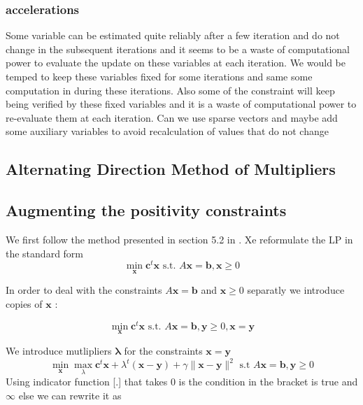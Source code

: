 \documentclass[11pt]{article}
\begin{document}
\subsubsection{accelerations}
Some variable can be estimated quite reliably after a few iteration and do not change in the subsequent iterations and it seems to be a waste of computational power to evaluate the update on these variables at each iteration. We would be temped to keep these variables fixed for some iterations and same some computation in during these iterations. Also some of the constraint will keep being verified by these fixed variables and it is a waste of computational power to re-evaluate them at each iteration. Can we use sparse vectors and maybe add some auxiliary variables to avoid recalculation of values that do not change

\subsection{Alternating Direction Method of Multipliers }
\subsection{Augmenting the positivity constraints}
We first follow the method presented in section 5.2 in  \cite{Boyd2010}.
Xe reformulate the LP in the standard form 
\begin{equation}
\mathop{min}_\mathbf{x} \mathbf{c}^t\mathbf{x} \text{ s.t. } A\mathbf{x}=\mathbf{b}, \mathbf{x}\geq 0
\end{equation}

In order to deal with the constraints $A\mathbf{x}=\mathbf{b}$ and $\mathbf{x}\geq 0$ separatly we introduce copies of $\mathbf{x}$ :

\begin{equation}
\mathop{min}_\mathbf{x} \mathbf{c}^t\mathbf{x} \text{ s.t. } A\mathbf{x}=\mathbf{b}, \mathbf{y}\geq 0,\mathbf{x}=\mathbf{y}
\end{equation}

We introduce mutlipliers $\mathbf{\lambda}$ for the constraints $\mathbf{x}=\mathbf{y}$
\begin{equation}
\mathop{min}_\mathbf{x} \mathop{max}_{\lambda} \mathbf{c}^t\mathbf{x} +\lambda^t (\mathbf{x}-\mathbf{y})+\gamma\|\mathbf{x}-\mathbf{y}\|^2 \text{ s.t } A\mathbf{x}=\mathbf{b},\mathbf{y}\geq 0
\end{equation}
Using indicator function [.] that takes $0$ is the condition in the bracket is true and $\infty$ else we can rewrite it as 
\end{document}
